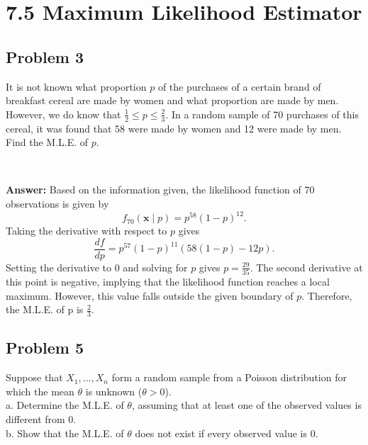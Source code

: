 \documentclass{article}
\begin{document}
\newpage

\section*{7.5 Maximum Likelihood Estimator}
\subsection*{Problem 3}
It is not known what proportion $p$ of the purchases of a certain brand of breakfast cereal are made by women and what proportion are made by men. However, we do know that $\frac{1}{2} \le p \le \frac{2}{3}$. In a random sample of 70 purchases of this cereal, it was found that 58 were made by women and 12 were made by men. Find the M.L.E. of $p$.

\

\textbf{Answer:} Based on the information given, the likelihood function of 70 observations is given by
\begin{equation*}
f_{70}(\boldsymbol{x} \mid p) = p^{58} (1-p)^{12}.
\end{equation*}
Taking the derivative with respect to $p$ gives
\begin{equation*}
\frac{df}{dp} = p^{57} (1-p)^{11} (58(1-p) - 12p).
\end{equation*}
Setting the derivative to 0 and solving for $p$ gives $p = \frac{29}{35}$. The second derivative at this point is negative, implying that the likelihood function reaches a local maximum. However, this value falls outside the given boundary of $p$. Therefore, the M.L.E. of p is $\frac{2}{3}$.

\bigskip

\subsection*{Problem 5}
Suppose that $X_1, \dots , X_n$ form a random sample from a Poisson distribution for which the mean $\theta$ is unknown ($\theta > 0$).\\
a. Determine the M.L.E. of $\theta$, assuming that at least one of the observed values is different from 0.\\
b. Show that the M.L.E. of $\theta$ does not exist if every observed value is 0.

\
\end{document}
